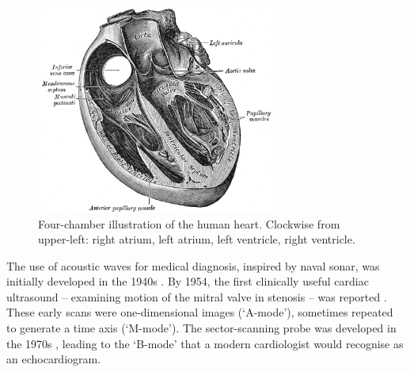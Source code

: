 \begin{figure}
\centering\includegraphics[width=0.7\textwidth]{figures/sample/Gray498.png} 
\caption[Four-chamber illustration of the human heart.]{Four-chamber illustration of the human heart.  Clockwise from upper-left: right atrium, left atrium, left ventricle, right ventricle.}
\label{fig:fourchamber}\end{figure}

The use of acoustic waves for medical diagnosis, inspired by naval sonar, was initially developed in the 1940s \cite{gagliardi_ultrasonography_1996}.  By 1954, the first clinically useful cardiac ultrasound -- examining motion of the mitral valve in stenosis -- was reported \cite{edler_ultrasonic_1957}.  These early scans were one-dimensional images (`A-mode'), sometimes repeated to generate a time axis (`M-mode').   The sector-scanning probe was developed in the 1970s \cite{bom_ultrasonic_1971,griffith_sector_1974}, leading to the `B-mode' that a modern cardiologist would recognise as an echocardiogram.
